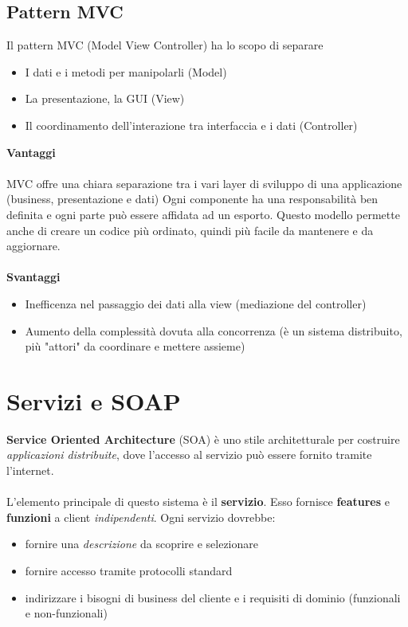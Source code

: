 \documentclass[12pt, a4paper]{article}
\begin{document}
    \subsection{Pattern MVC}
    Il pattern MVC (Model View Controller) ha lo scopo di separare
    \begin{itemize}
        \item I dati e i metodi per manipolarli (Model)
        \item La presentazione, la GUI (View)
        \item Il coordinamento dell'interazione tra interfaccia e i dati (Controller)
    \end{itemize}
    \textbf{Vantaggi}
    \\\\MVC offre una chiara separazione tra i vari layer di sviluppo di una applicazione (business, presentazione e dati)
    Ogni componente ha una responsabilità ben definita e ogni parte può essere affidata ad un esporto.
    Questo modello permette anche di creare un codice più ordinato, quindi più facile da mantenere e da aggiornare.
    \\\\
    \textbf{Svantaggi}
    \begin{itemize}
        \item Inefficenza nel passaggio dei dati alla view (mediazione del controller)
        \item Aumento della complessità dovuta alla concorrenza (è un sistema distribuito, più "attori" da coordinare e mettere assieme)
    \end{itemize}

    \newpage
    \section{Servizi e SOAP}
    \textbf{Service Oriented Architecture} (SOA) è uno stile architetturale per costruire \textit{applicazioni distribuite}, dove
    l'accesso al servizio può essere fornito tramite l'internet.
    \\\\
    L'elemento principale di questo sistema è il \textbf{servizio}. Esso fornisce \textbf{features} e \textbf{funzioni} a client \textit{indipendenti}.
    Ogni servizio dovrebbe:
    \begin{itemize}
        \item fornire una \textit{descrizione} da scoprire e selezionare
        \item fornire accesso tramite protocolli standard
        \item indirizzare i bisogni di business del cliente e i requisiti di dominio (funzionali e non-funzionali)
    \end{itemize}
\end{document}
